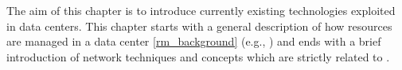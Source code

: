 The aim of this chapter is to introduce currently existing technologies exploited in data centers.
This chapter starts with a general description of how resources are managed in a data center \autoref{rm_background} (e.g., ) and ends with a brief introduction of network techniques and concepts which are strictly related to .